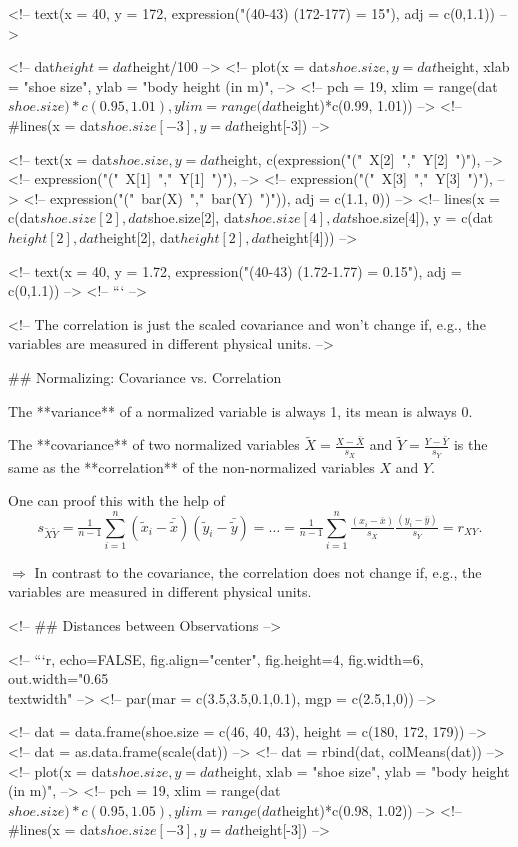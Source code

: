 {<!-- text(x = 40, y = 172, expression("(40-43) (172-177) = 15"), adj = c(0,1.1)) -->

<!-- dat$height = dat$height/100 -->
<!-- plot(x = dat$shoe.size, y = dat$height, xlab = "shoe size", ylab = "body height (in m)", -->
<!--   pch = 19, xlim = range(dat$shoe.size)*c(0.95, 1.01), ylim = range(dat$height)*c(0.99, 1.01)) -->
<!-- #lines(x = dat$shoe.size[-3], y = dat$height[-3]) -->

<!-- text(x = dat$shoe.size, y = dat$height, c(expression("("~X[2]~","~Y[2]~")"), -->
<!--     expression("("~X[1]~","~Y[1]~")"),  -->
<!--     expression("("~X[3]~","~Y[3]~")"),  -->
<!--     expression("("~bar(X)~","~bar(Y)~")")), adj = c(1.1, 0)) -->
<!-- lines(x = c(dat$shoe.size[2], dat$shoe.size[2], dat$shoe.size[4], dat$shoe.size[4]), y = c(dat$height[2], dat$height[2], dat$height[2], dat$height[4])) -->

<!-- text(x = 40, y = 1.72, expression("(40-43) (1.72-1.77) = 0.15"), adj = c(0,1.1)) -->
<!-- ``` -->

<!-- The correlation is just the scaled covariance and won't change if, e.g., the variables are measured in different physical units. -->

## Normalizing: Covariance vs. Correlation

The **variance** of a normalized variable is always 1, its mean is always 0.

The **covariance** of two normalized variables $\tilde{X} = \tfrac{X - \bar{X}}{s_X}$ and $\tilde{Y} = \tfrac{Y - \bar{Y}}{s_Y}$ is the same as the **correlation** of the non-normalized variables $X$ and $Y$.

One can proof this with the help of
$$s_{\tilde{X}\tilde{Y}}=\tfrac{1}{n-1}\sum_{i=1}^{n}{(\tilde{x}_i-\bar{\tilde{x}})(\tilde{y}_i-\bar{\tilde{y}})} = \hdots =  \tfrac{1}{n-1}\sum_{i=1}^{n}{\tfrac{(x_i-\bar{x})}{s_{X}}\tfrac{(y_i-\bar{y})}{s_{Y}}} = r_{XY}.$$

$\Rightarrow$ In contrast to the covariance, the correlation does not change if, e.g., the variables are measured in different physical units.

<!-- ## Distances between Observations -->

<!-- ```{r, echo=FALSE, fig.align="center", fig.height=4, fig.width=6, out.width="0.65\\textwidth"} -->
<!-- par(mar = c(3.5,3.5,0.1,0.1), mgp = c(2.5,1,0)) -->

<!-- dat = data.frame(shoe.size = c(46, 40, 43), height = c(180, 172, 179)) -->
<!-- dat = as.data.frame(scale(dat)) -->
<!-- dat = rbind(dat, colMeans(dat)) -->
<!-- plot(x = dat$shoe.size, y = dat$height, xlab = "shoe size", ylab = "body height (in m)", -->
<!--   pch = 19, xlim = range(dat$shoe.size)*c(0.95, 1.05), ylim = range(dat$height)*c(0.98, 1.02)) -->
<!-- #lines(x = dat$shoe.size[-3], y = dat$height[-3]) -->

}

